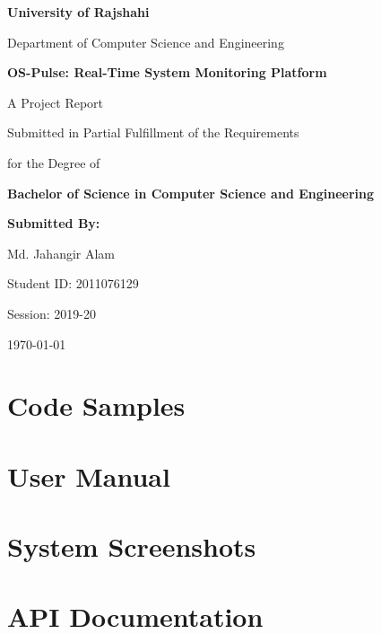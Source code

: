 \documentclass[12pt,a4paper]{report}
\begin{document}
\begin{titlepage}
    \centering
    \vspace*{1cm}
    
    {\LARGE\bfseries University of Rajshahi\par}
    \vspace{0.5cm}
    {\large Department of Computer Science and Engineering\par}
    \vspace{2cm}
    
    {\Huge\bfseries OS-Pulse: Real-Time System Monitoring Platform\par}
    \vspace{1.5cm}
    
    {\Large A Project Report\par}
    \vspace{0.5cm}
    {\large Submitted in Partial Fulfillment of the Requirements\par}
    {\large for the Degree of\par}
    \vspace{0.5cm}
    {\Large\bfseries Bachelor of Science in Computer Science and Engineering\par}
    \vspace{2cm}
    
    {\large\bfseries Submitted By:\par}
    \vspace{0.3cm}
    {\large Md. Jahangir Alam\par}
    {\large Student ID: 2011076129\par}
    {\large Session: 2019-20\par}
    \vspace{2cm}
    
    {\large\today\par}
\end{titlepage}




\tableofcontents













\appendix
\chapter{Code Samples}
\chapter{User Manual}
\chapter{System Screenshots}
\chapter{API Documentation}
\end{document}
